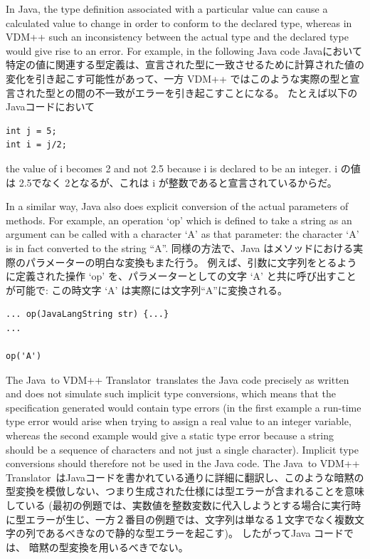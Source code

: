 \documentclass[\pformat,12pt]{jarticle}
\newcommand{\JAVA}{Java}
\newcommand{\TjTov}{The \JAVA\ to VDM++ Translator}
\begin{document}
In Java, the type definition associated with a particular value can
cause a calculated value to change in order to conform to the declared
type, whereas in VDM++ such an inconsistency between the actual type
and the declared type would give rise to an error. For example, in the 
following Java code
Javaにおいて特定の値に関連する型定義は、宣言された型に一致させるために計算された値の変化を引き起こす可能性があって、一方 VDM++ ではこのような実際の型と宣言された型との間の不一致がエラーを引き起こすことになる。
たとえば以下の Javaコードにおいて

\begin{small}
\begin{verbatim}
int j = 5;
int i = j/2;
\end{verbatim}
\end{small}

the value of i becomes 2 and not 2.5 because i is declared to be an
integer. 
 i の値は 2.5でなく 2となるが、これは i が整数であると宣言されているからだ。 

In a similar way, Java also does explicit conversion of the actual
parameters of methods. For example, an operation `op' which is defined
to take a string as an argument can be called with a character `A' as
that parameter: the character `A' is in fact converted to the string
``A''. 
同様の方法で、Java はメソッドにおける実際のパラメーターの明白な変換もまた行う。
例えば、引数に文字列をとるように定義された操作 `op' を、パラメーターとしての文字 `A' と共に呼び出すことが可能で: この時文字 `A' は実際には文字列``A''に変換される。 
\begin{small}
\begin{verbatim}
... op(JavaLangString str) {...}
...

op('A')
\end{verbatim}
\end{small}

\TjTov\ translates the Java code precisely as written and does not
simulate such implicit type conversions, which means that the
specification generated would contain type errors (in the first
example a run-time type error would arise when trying to assign a real
value to an integer variable, whereas the second example would give a
static type error because a string should be a sequence of characters
and not just a single character). Implicit type conversions should
therefore not be used in the Java code.
\TjTov\ はJavaコードを書かれている通りに詳細に翻訳し、このような暗黙の型変換を模倣しない、つまり生成された仕様には型エラーが含まれることを意味している (最初の例題では、実数値を整数変数に代入しようとする場合に実行時に型エラーが生じ、一方２番目の例題では、文字列は単なる１文字でなく複数文字の列であるべきなので静的な型エラーを起こす)。 
したがってJava コードでは、 暗黙の型変換を用いるべきでない。
\end{document}
